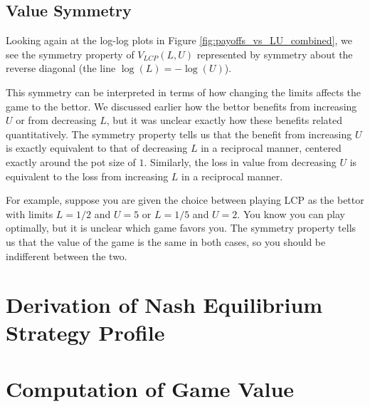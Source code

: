 \documentclass[a4paper,12pt]{article}
\theoremstyle{plain}
\theoremstyle{definition}
\begin{document}
\subsection{Value Symmetry}

Looking again at the log-log plots in Figure \ref{fig:payoffs_vs_LU_combined}, we see the symmetry property of $V_{LCP}(L, U)$ represented by symmetry about the reverse diagonal (the line $\log(L) = -\log(U)$). 

This symmetry can be interpreted in terms of how changing the limits affects the game to the bettor. We discussed earlier how the bettor benefits from increasing $U$ or from decreasing $L$, but it was unclear exactly how these benefits related quantitatively. The symmetry property tells us that the benefit from increasing $U$ is exactly equivalent to that of decreasing $L$ in a reciprocal manner, centered exactly around the pot size of $1$. Similarly, the loss in value from decreasing $U$ is equivalent to the loss from increasing $L$ in a reciprocal manner.

For example, suppose you are given the choice between playing LCP as the bettor with limits $L=1/2$ and $U=5$ or $L=1/5$ and $U=2$. You know you can play optimally, but it is unclear which game favors you. The symmetry property tells us that the value of the game is the same in both cases, so you should be indifferent between the two.


\appendix
\section{Derivation of Nash Equilibrium Strategy Profile}
\label{app:derivation}


\section{Computation of Game Value}
\label{app:value_computation}
\end{document}
